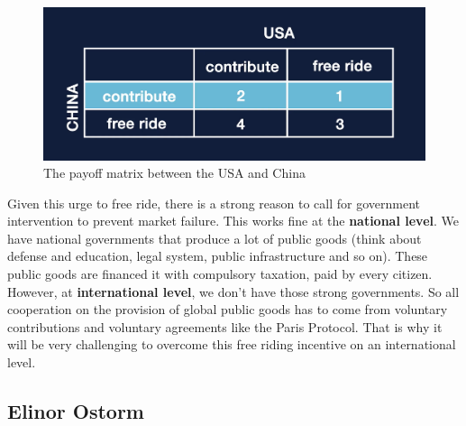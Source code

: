 \documentclass[../summary.tex]{subfiles}
\begin{document}
	  \begin{figure}[htbp]
	  	\centering
	  	\includegraphics[width=0.9\linewidth]{images/10-payoff-matrix.png}
	  	\caption{The payoff matrix between the USA and China}
	  	\label{fig:payoff-matrix}
	  \end{figure}
	  
	  Given this urge to free ride, there is a strong reason to call for government intervention to prevent market failure. This works fine at the \textbf{national level}. We have national governments that produce a lot of public goods (think about defense and education, legal system, public infrastructure and so on). These public goods are financed it with compulsory taxation, paid by every citizen. However, at \textbf{international level}, we don't have those strong governments. So all cooperation on the provision of global public goods has to come from voluntary contributions and voluntary agreements like the Paris Protocol. That is why it will be very challenging to overcome this free riding incentive on an international level.
	  
	  \subsection{Elinor Ostorm}
	  
\end{document}
